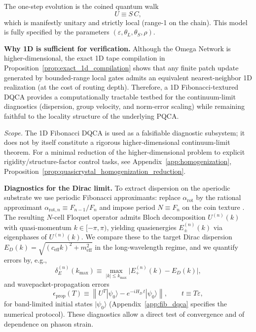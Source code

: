 The one-step evolution is the coined quantum walk
\begin{equation}
    U \equiv S\,C,
\end{equation}
which is manifestly unitary and strictly local (range-1 on the chain). This model is fully specified by the parameters $(\varepsilon,\theta_L,\theta_S,\rho)$.
\par
\noindent\textbf{Why 1D is sufficient for verification.}
Although the Omega Network is higher-dimensional, the exact 1D tape compilation in Proposition~\ref{prop:exact_1d_compilation} shows that any finite patch update generated by bounded-range local gates admits an equivalent nearest-neighbor 1D realization (at the cost of routing depth). Therefore, a 1D Fibonacci-textured DQCA provides a computationally tractable testbed for the continuum-limit diagnostics (dispersion, group velocity, and norm-error scaling) while remaining faithful to the locality structure of the underlying PQCA.
\par\noindent\textit{Scope.} The 1D Fibonacci DQCA is used as a falsifiable diagnostic subsystem; it does not by itself constitute a rigorous higher-dimensional continuum-limit theorem. For a minimal reduction of the higher-dimensional problem to explicit rigidity/structure-factor control tasks, see Appendix~\ref{app:homogenization}, Proposition~\ref{prop:quasicrystal_homogenization_reduction}.
\par
\noindent\textbf{Diagnostics for the Dirac limit.}
To extract dispersion on the aperiodic substrate we use periodic Fibonacci approximants: replace $\alpha_{\mathrm{rot}}$ by the rational approximant $\alpha_{\mathrm{rot},n}\equiv F_{n-1}/F_n$ and impose period $N\equiv F_n$ on the coin texture \cite{Senechal1995,BaakeGrimm2013AperiodicOrder}. The resulting $N$-cell Floquet operator admits Bloch decomposition $U^{(n)}(k)$ with quasi-momentum $k\in[-\pi,\pi)$, yielding quasienergies $E^{(n)}_\pm(k)$ via eigenphases of $U^{(n)}(k)$.
We compare these to the target Dirac dispersion $E_D(k)=\sqrt{(c_{\mathrm{eff}}k)^2+m_{\mathrm{eff}}^2}$ in the long-wavelength regime, and we quantify errors by, e.g.,
\begin{equation}
    \delta_E^{(n)}(k_{\max})\equiv \max_{|k|\le k_{\max}} \big|E^{(n)}_+(k)-E_D(k)\big|,
\end{equation}
and wavepacket-propagation errors
\begin{equation}
    \epsilon_{\mathrm{prop}}(T)\equiv \left\|U^T|\psi_0\rangle-e^{-iH_D\,t}|\psi_0\rangle\right\|,\qquad t\equiv T\varepsilon,
\end{equation}
for band-limited initial states $|\psi_0\rangle$ (Appendix~\ref{app:fib_dqca} specifies the numerical protocol). These diagnostics allow a direct test of convergence and of dependence on phason strain.

